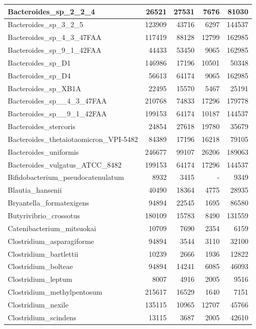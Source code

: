 \documentclass[12pt,a4paper]{article}
\begin{document}
\begin{table}[ht]
\begin{center}
\begin{tabular}{|l*{4}{|r}|}
Bacteroides\_sp\_2\_2\_4 & 26521 & 27531 & 7676 & 81030 \\ \hline
Bacteroides\_sp\_3\_2\_5 & 123909 & 43716 & 6297 & 144537 \\ \hline
Bacteroides\_sp\_4\_3\_47FAA & 117419 & 88128 & 12799 & 162985 \\ \hline
Bacteroides\_sp\_9\_1\_42FAA & 44433 & 53450 & 9065 & 162985 \\ \hline
Bacteroides\_sp\_D1 & 146986 & 17196 & 10501 & 50348 \\ \hline
Bacteroides\_sp\_D4 & 56613 & 64174 & 9065 & 162985 \\ \hline
Bacteroides\_sp\_XB1A & 22495 & 15570 & 5467 & 25191 \\ \hline
Bacteroides\_sp\_\_4\_3\_47FAA & 210768 & 74833 & 17296 & 179778 \\ \hline
Bacteroides\_sp\_\_9\_1\_42FAA & 199153 & 64174 & 10187 & 144537 \\ \hline
Bacteroides\_stercoris & 24854 & 27618 & 19780 & 35679 \\ \hline
Bacteroides\_thetaiotaomicron\_VPI-5482 & 84389 & 17196 & 16218 & 79105 \\ \hline
Bacteroides\_uniformis & 246677 & 99107 & 26206 & 189063 \\ \hline
Bacteroides\_vulgatus\_ATCC\_8482 & 199153 & 64174 & 17296 & 144537 \\ \hline
Bifidobacterium\_pseudocatenulatum & 8932 & 3415 & - & 9349 \\ \hline
Blautia\_hansenii & 40490 & 18364 & 4775 & 28935 \\ \hline
Bryantella\_formatexigens & 94894 & 22545 & 1695 & 86580 \\ \hline
Butyrivibrio\_crossotus & 180109 & 15783 & 8490 & 131559 \\ \hline
Catenibacterium\_mitsuokai & 10709 & 7690 & 2354 & 6159 \\ \hline
Clostridium\_asparagiforme & 94894 & 3544 & 3110 & 32100 \\ \hline
Clostridium\_bartlettii & 10239 & 2666 & 1936 & 12822 \\ \hline
Clostridium\_bolteae & 94894 & 14241 & 6085 & 46093 \\ \hline
Clostridium\_leptum & 8007 & 4916 & 2005 & 9516 \\ \hline
Clostridium\_methylpentosum & 215617 & 16529 & 1640 & 7151 \\ \hline
Clostridium\_nexile & 135115 & 10965 & 12707 & 45766 \\ \hline
Clostridium\_scindens & 13115 & 3687 & 2005 & 42610 \\ \hline

\end{tabular}
\end{center}
\end{table}
\end{document}
